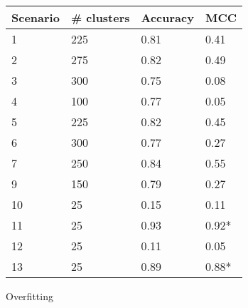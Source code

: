 \begin{tabular}{llll}
\toprule
\textbf{Scenario}   & \textbf{\# clusters}  & \textbf{Accuracy} & \textbf{MCC}    \\
\midrule
1                   & 225                   & 0.81              & 0.41            \\ %
2                   & 275                   & 0.82              & 0.49            \\ %
3                   & 300                   & 0.75              & 0.08            \\ %
4                   & 100                   & 0.77              & 0.05            \\ %
5                   & 225                   & 0.82              & 0.45            \\ %
6                   & 300                   & 0.77              & 0.27            \\ %
7                   & 250                   & 0.84              & 0.55            \\ %
9                   & 150                   & 0.79              & 0.27            \\ %
10                  & 25                    & 0.15              & 0.11            \\ %
11                  & 25                    & 0.93              & 0.92*            \\ %
12                  & 25                    & 0.11              & 0.05            \\ %
13                  & 25                    & 0.89              & 0.88*            \\ %
\bottomrule
\end{tabular}
\tiny{Overfitting}